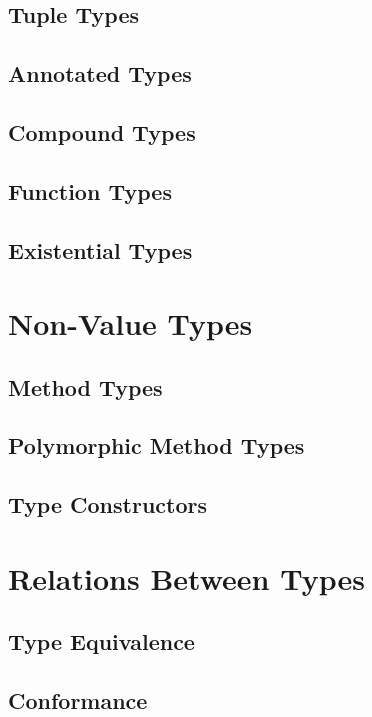 \subsection{Tuple Types}

\subsection{Annotated Types}

\subsection{Compound Types}

\subsection{Function Types}

\subsection{Existential Types}

\section{Non-Value Types}

\subsection{Method Types}

\subsection{Polymorphic Method Types}

\subsection{Type Constructors}

\section{Relations Between Types}

\subsection{Type Equivalence}

\subsection{Conformance}

